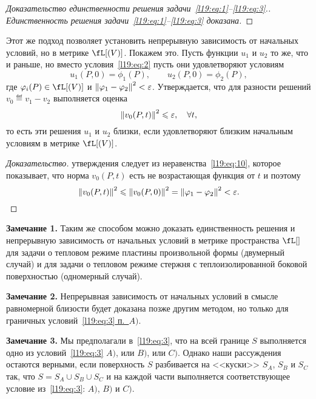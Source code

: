 \begin{proof}[Доказательство единственности решения задачи~\eqref{l19:eq:1}--\eqref{l19:eq:3}.]
	\noindent \emph{Единственность решения задачи~\eqref{l19:eq:1}--\eqref{l19:eq:3} доказана.}
\end{proof}
Этот же подход позволяет установить непрерывную зависимость от начальных условий, но в метрике $\fL[(V)]$. Покажем это.
Пусть функции $u_1$ и $u_2$ то же, что и раньше, но вместо условия~\eqref{l19:eq:2} пусть они удовлетворяют условиям 
\begin{equation*}
	 u_1(P,0)=\phi_1(P),\qquad u_2(P,0)=\phi_2(P),
\end{equation*}
где $\phi_i(P)\in\fL[(V)]$ и $\left\|\varphi_1-\varphi_2\right\|^2<\varepsilon$. Утверждается, что для разности решений $v_0\eqdef v_1-v_2$ выполняется оценка 
\begin{equation*}
	\left\|v_0(P,t)\right\|^2\leqslant\varepsilon,\quad\forall t,
\end{equation*}
то есть эти решения $u_1$ и $u_2$ близки, если удовлетворяют близким начальным условиям в метрике $\fL[(V)]$.
\begin{proof}[Доказательство] утверждения следует из неравенства~\eqref{l19:eq:10}, которое показывает, что норма $v_0(P,t)$ есть не возрастающая функция от $t$ и поэтому 
	\begin{equation*}
		 \left\|v_0(P,t)\right\|^2\leqslant\left\|v_0(P,0)\right\|^2=\left\|\varphi_1-\varphi_2\right\|^2<\varepsilon.
	\end{equation*}
\end{proof}

\noindent\textbf{Замечание 1. }Таким же способом можно доказать единственность решения и непрерывную зависимость от начальных условий в метрике пространства $\fL[]$ для задачи о тепловом режиме пластины произвольной формы (двумерный случай) и для задачи о тепловом режиме стержня с теплоизолированной боковой поверхностью (одномерный случай).

\noindent\textbf{Замечание 2. }Непрерывная зависимость от начальных условий в смысле равномерной близости будет доказана позже другим методом, но только для граничных условий~\hyperref[l19:eq:3]{\eqref{l19:eq:3} п.~$A)$}.

\noindent\textbf{Замечание 3. }Мы предполагали в~\eqref{l19:eq:3}, что на всей границе $S$ выполняется одно из условий~\eqref{l19:eq:3} \hyperref[l19:eq:3]{$A)$}, или \hyperref[l19:eq:3]{$B)$}, или \hyperref[l19:eq:3]{$C)$}. Однако наши рассуждения остаются верными, если поверхность $S$ разбивается на <<куски>> $S_A$, $S_B$ и $S_C$ так, что $S=S_A\cup S_B\cup S_C$ и на каждой части выполняется соответствующее условие из~\eqref{l19:eq:3}: \hyperref[l19:eq:3]{$A)$}, \hyperref[l19:eq:3]{$B)$} и \hyperref[l19:eq:3]{$C)$}.


